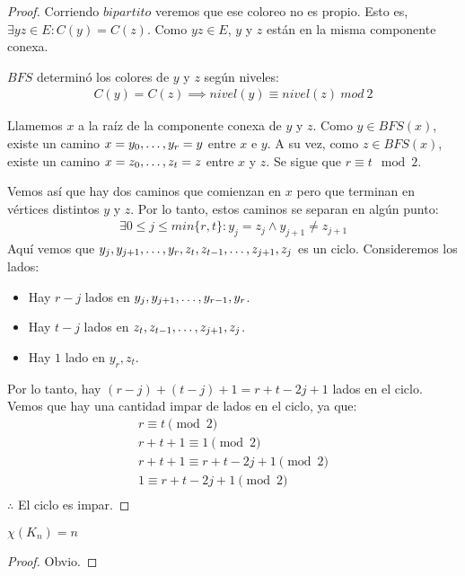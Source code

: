\begin{proof}
  Corriendo $bipartito$ veremos que ese coloreo no es propio. Esto es,
  $\exists yz \in E : C(y) = C(z)$. Como $yz \in E$, $y$ y $z$ están
  en la misma componente conexa.
  
  $BFS$ determinó los colores de $y$ y $z$ según niveles:
  \begin{align}
    C(y) = C(z) \implies nivel(y) \equiv nivel(z)\ mod\ 2
  \end{align}
  
  Llamemos $x$ a la raíz de la componente conexa de $y$ y $z$. Como $y \in BFS(x)$, existe un camino $x = y_0, \mathellipsis, y_r = y$ entre $x$ e $y$. A su vez, como $z \in BFS(x)$, existe un camino $x = z_0, \mathellipsis, z_t = z$ entre $x$ y $z$. Se sigue que $r \equiv t \mod{2}$.
  
  Vemos así que hay dos caminos que comienzan en $x$ pero que terminan en vértices distintos $y$ y $z$. Por lo tanto, estos caminos se separan en algún punto:
  \begin{align}
    \exists 0 \le j \le min\{r,t\} \colon y_j = z_j \wedge y_{j+1} \neq z_{j+1}
  \end{align}
  Aquí vemos que $y_j, y_{j+1}, \mathellipsis, y_r, z_t, z_{t-1}, \mathellipsis, z_{j+1}, z_{j}$ es un ciclo.
  Consideremos los lados:
  
  \begin{itemize}
  \item Hay $r-j$ lados en $y_j, y_{j+1}, \mathellipsis, y_{r-1}, y_r$.
  \item Hay $t-j$ lados en $z_t, z_{t-1}, \mathellipsis, z_{j+1}, z_j$.
  \item Hay $1$ lado en $y_r,z_t$.
  \end{itemize}
  
  Por lo tanto, hay $(r-j)+(t-j)+1 = r+t-2j+1$ lados en el ciclo. Vemos que hay una cantidad impar de lados en el ciclo, ya que:
  \begin{align}
    r \equiv t \pmod{2}\\
    r + t + 1 \equiv 1 \pmod{2}\\
    r + t + 1 \equiv r + t - 2j + 1 \pmod 2\\
    1 \equiv r + t - 2j + 1 \pmod 2\\
  \end{align}
  $\therefore$ El ciclo es impar.
\end{proof}

\begin{proposition}\label{chi_es_completo}
  $\chi(K_{n}) = n$
\end{proposition}
\begin{proof}
  Obvio.
\end{proof}

